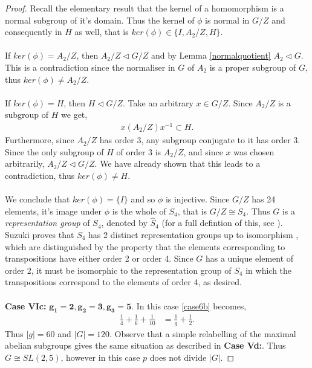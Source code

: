 \documentclass[a4paper , 11pt]{book}
\theoremstyle{definition}
\theoremstyle{remark}
\begin{document}
\begin{proof}
Recall the elementary result that the kernel of a homomorphism is a normal subgroup of it's domain. Thus the kernel of $\phi$ is normal in $G / Z$ and consequently in $H$ as well, that is $ker(\phi) \in\{ I , A_2 / Z, H \}$. \\
\\
If $ker(\phi) = A_2 / Z$, then $A_2 / Z \vartriangleleft G / Z$ and by Lemma \ref{normalquotient} $A_2 \vartriangleleft G$. This is a contradiction since the normaliser in $G$ of $A_2$ is a proper subgroup of $G$, thus $ker(\phi) \neq A_2 / Z$. \\
\\
If $ker(\phi) = H$, then $H \vartriangleleft G / Z$. Take an arbitrary $x \in G / Z$. Since $A_2 / Z$ is a subgroup of $H$ we get,
\begin{align*} x (A_2 / Z) x^{-1} \subset H.
\end{align*}
Furthermore, since $A_2 / Z$ has order 3, any subgroup conjugate to it has order 3. Since the only subgroup of $H$ of order 3 is $A_2 / Z$, and since $x$ was chosen arbitrarily, $A_2 / Z \vartriangleleft G / Z$. We have already shown that this leads to a contradiction, thus $ker(\phi) \neq H$. \\
\\
We conclude that $ker(\phi) = \{ I \}$ and so $\phi$ is injective. Since $G / Z$ has 24 elements, it's image under $\phi$ is the whole of $S_4$, that is $G / Z \cong S_4$. Thus $G$ is a \textit{representation group} of $S_4$, denoted by $\widehat{S}_4$ (for a full defintion of this, see \cite{suzuki}). Suzuki proves that $S_4$ has 2 distinct representation groups up to isomorphism \cite[p.301]{suzuki}, which are distinguished by the property that the elements corresponding to transpositions have either order 2 or order 4. Since $G$ has a unique element of order 2, it must be isomorphic to the representation group of $S_4$ in which the transpositions correspond to the elements of order 4, as desired.\\
\\
\textbullet \space \textbf{Case VIc:} $\pmb{g_1 = 2, g_2 = 3, g_3 = 5}$.  In this case \eqref{case6b} becomes,
\begin{align*} \frac{1}{4} + \frac{1}{6} + \frac{1}{10} &= \frac{1}{g} + \frac{1}{2}.
\end{align*}
Thus $|g| = 60$ and $|G| = 120$. Observe that a simple relabelling of the maximal abelian subgroups gives the same situation as described in \textbf{Case Vd:}. Thus $G \cong SL(2,5)$, however in this case $p$ does not divide $|G|$.

\end{proof}
\end{document}
